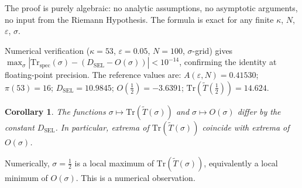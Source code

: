 \documentclass[11pt]{article}
\newtheorem{corollary}[theorem]{Corollary}
\newcommand{\Tt}{\widetilde{T}}
\newcommand{\DSEL}{D_{\mathrm{SEL}}}
\begin{document}
The proof is purely algebraic: no analytic assumptions, no asymptotic
arguments, no input from the Riemann Hypothesis.
The formula is exact for any finite $\kappa$, $N$, $\varepsilon$, $\sigma$.

Numerical verification ($\kappa=53$, $\varepsilon=0.05$, $N=100$,
$\sigma$-grid) gives
$\max_\sigma|\mathrm{Tr}_{\mathrm{spec}}(\sigma)-(\DSEL-O(\sigma))|<10^{-14}$,
confirming the identity at floating-point precision.
The reference values are:
$A(\varepsilon,N)=0.41530$; $\pi(53)=16$;
$\DSEL = 10.9845$; $O(\tfrac{1}{2})=-3.6391$;
$\mathrm{Tr}(\Tt(\tfrac{1}{2}))=14.624$.

\begin{corollary}
\label{cor:extrema}
The functions $\sigma\mapsto\mathrm{Tr}(\Tt(\sigma))$ and
$\sigma\mapsto O(\sigma)$ differ by the constant $\DSEL$.
In particular, extrema of $\mathrm{Tr}(\Tt(\sigma))$ coincide
with extrema of $O(\sigma)$.
\end{corollary}

Numerically, $\sigma=\tfrac{1}{2}$ is a local maximum of
$\mathrm{Tr}(\Tt(\sigma))$, equivalently a local minimum of $O(\sigma)$.
This is a numerical observation.
\end{document}
